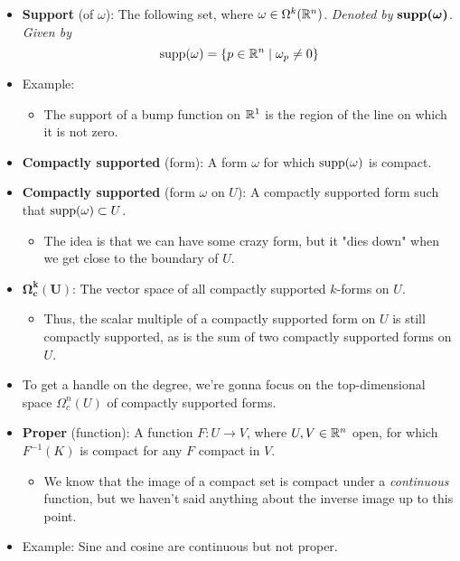 \documentclass[../notes.tex]{subfiles}
\begin{document}
\begin{itemize}
\begin{itemize}
    \end{itemize}
    \item \textbf{Support} (of $\omega$): The following set, where $\omega\in\ome[k]{\R^n}$. \emph{Denoted by} $\bm{\supp(\omega)}$. \emph{Given by}
    \begin{equation*}
        \supp(\omega) = \{p\in\R^n\mid\omega_p\neq 0\}
    \end{equation*}
    \item Example:
    \begin{itemize}
        \item The support of a bump function on $\R^1$ is the region of the line on which it is not zero.
    \end{itemize}
    \item \textbf{Compactly supported} (form): A form $\omega$ for which $\supp(\omega)$ is compact.
    \item \textbf{Compactly supported} (form $\omega$ on $U$): A compactly supported form such that $\supp(\omega)\subset U$.
    \begin{itemize}
        \item The idea is that we can have some crazy form, but it "dies down" when we get close to the boundary of $U$.
    \end{itemize}
    \item $\bm{\Omega_c^k(U)}$: The vector space of all compactly supported $k$-forms on $U$.
    \begin{itemize}
        \item Thus, the scalar multiple of a compactly supported form on $U$ is still compactly supported, as is the sum of two compactly supported forms on $U$.
    \end{itemize}
    \item To get a handle on the degree, we're gonna focus on the top-dimensional space $\Omega_c^n(U)$ of compactly supported forms.
    \item \textbf{Proper} (function): A function $F:U\to V$, where $U,V\in\R^n$ open, for which $F^{-1}(K)$ is compact for any $F$ compact in $V$.
    \begin{itemize}
        \item We know that the image of a compact set is compact under a \emph{continuous} function, but we haven't said anything about the inverse image up to this point.
    \end{itemize}
    \item Example: Sine and cosine are continuous but not proper.
    \begin{itemize}

\end{itemize}
\end{itemize}
\end{document}
